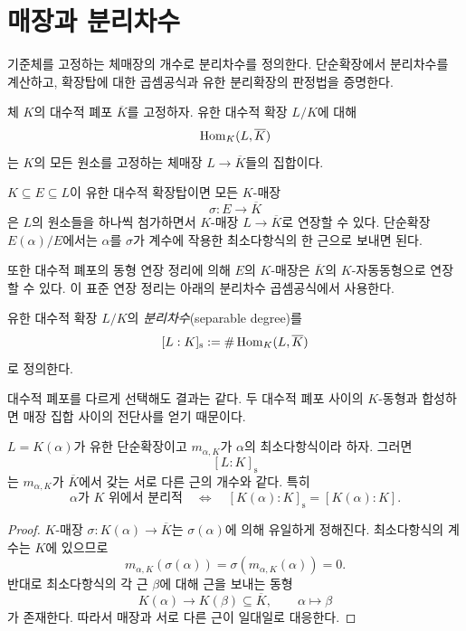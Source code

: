 \clearpage
\section{매장과 분리차수}
\label{sec:separable-degree}

\begin{learninggoal}
기준체를 고정하는 체매장의 개수로 분리차수를 정의한다. 단순확장에서 분리차수를 계산하고, 확장탑에 대한 곱셈공식과 유한 분리확장의 판정법을 증명한다.
\end{learninggoal}

체 $K$의 대수적 폐포 $\overline K$를 고정하자. 유한 대수적 확장 $L/K$에 대해
\[
  \operatorname{Hom}_K(L,\overline K)
\]
는 $K$의 모든 원소를 고정하는 체매장 $L\to\overline K$들의 집합이다.

\begin{remark}[매장의 연장]
$K\subseteq E\subseteq L$이 유한 대수적 확장탑이면 모든 $K$-매장
\[
  \sigma:E\longrightarrow\overline K
\]
은 $L$의 원소들을 하나씩 첨가하면서 $K$-매장 $L\to\overline K$로 연장할 수 있다. 단순확장 $E(\alpha)/E$에서는 $\alpha$를 $\sigma$가 계수에 작용한 최소다항식의 한 근으로 보내면 된다.

또한 대수적 폐포의 동형 연장 정리에 의해 $E$의 $K$-매장은 $\overline K$의 $K$-자동동형으로 연장할 수 있다. 이 표준 연장 정리는 아래의 분리차수 곱셈공식에서 사용한다.
\end{remark}

\begin{definition}[분리차수]
유한 대수적 확장 $L/K$의 \emph{분리차수}(separable degree)를
\[
  [L:K]_{\mathrm s}
  :=\#\operatorname{Hom}_K(L,\overline K)
\]
로 정의한다.
\end{definition}

대수적 폐포를 다르게 선택해도 결과는 같다. 두 대수적 폐포 사이의 $K$-동형과 합성하면 매장 집합 사이의 전단사를 얻기 때문이다.

\begin{lemma}
$L=K(\alpha)$가 유한 단순확장이고 $m_{\alpha,K}$가 $\alpha$의 최소다항식이라 하자. 그러면
\[
  [L:K]_{\mathrm s}
\]
는 $m_{\alpha,K}$가 $\overline K$에서 갖는 서로 다른 근의 개수와 같다. 특히
\[
  \alpha\text{가 }K\text{ 위에서 분리적}
  \quad\Longleftrightarrow\quad
  [K(\alpha):K]_{\mathrm s}=[K(\alpha):K].
\]
\end{lemma}

\begin{proof}
$K$-매장 $\sigma:K(\alpha)\to\overline K$는 $\sigma(\alpha)$에 의해 유일하게 정해진다. 최소다항식의 계수는 $K$에 있으므로
\[
  m_{\alpha,K}(\sigma(\alpha))
  =\sigma(m_{\alpha,K}(\alpha))=0.
\]
반대로 최소다항식의 각 근 $\beta$에 대해 근을 보내는 동형
\[
  K(\alpha)\longrightarrow K(\beta)\subseteq\overline K,
  \qquad
  \alpha\longmapsto\beta
\]
가 존재한다. 따라서 매장과 서로 다른 근이 일대일로 대응한다.
\end{proof}

